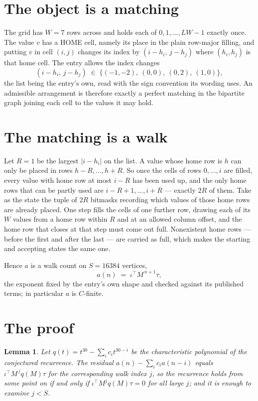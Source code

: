 \documentclass[11pt,a4paper]{article}
\theoremstyle{plain}
\newtheorem{lemma}[theorem]{Lemma}
\theoremstyle{definition}
\begin{document}
\section{The object is a matching}

The grid has $W=7$ rows across and holds each of $0,1,\dots,LW-1$ exactly once. The value
$v$ has a HOME cell, namely its place in the plain row-major filling, and putting $v$ in cell
$(i,j)$ changes its index by $(i-h_i,\,j-h_j)$ where $(h_i,h_j)$ is that home cell. The entry
allows the index changes
\[
(i-h_i,\,j-h_j)\;\in\;\{(-1,-2),\ (0,0),\ (0,2),\ (1,0)\},
\]
the list being the entry's own, read with the sign convention its wording uses. An admissible
arrangement is therefore exactly a perfect matching in the bipartite graph joining each cell to
the values it may hold.

\section{The matching is a walk}

Let $R=1$ be the largest $|i-h_i|$ on the list. A value whose home row is $h$ can only be
placed in rows $h-R,\dots,h+R$. So once the cells of rows $0,\dots,i$ are filled, every
value with home row at most $i-R$ has been used up, and the only home rows that can be
partly used are $i-R+1,\dots,i+R$ --- exactly $2R$ of them. Take as the state the tuple of
$2R$ bitmasks recording which values of those home rows are already placed. One step fills
the cells of one further row, drawing each of its $W$ values from a home row within $R$
and at an allowed column offset, and the home row that closes at that step must come out
full. Nonexistent home rows --- before the first and after the last --- are carried as
full, which makes the starting and accepting states the same one.

Hence $a$ is a walk count on $S=16384$ vertices,
\[
a(n)\;=\;\iota^{\!\top}M^{\,n+1}\tau ,
\]
the exponent fixed by the entry's own shape and checked against its published terms; in
particular $a$ is $C$-finite.

\section{The proof}

\begin{lemma}\label{lem:crit}
Let $q(t)=t^{30}-\sum_i c_it^{30-i}$ be the characteristic polynomial of the
conjectured recurrence. The residual $a(n)-\sum_ic_ia(n-i)$ equals
$\iota^{\!\top}M^{\,j}q(M)\tau$ for the corresponding walk index $j$, so the recurrence
holds from some point on if and only if $\iota^{\!\top}M^{j}q(M)\tau=0$ for all large $j$;
and it is enough to examine $j<S$.
\end{lemma}
\end{document}
